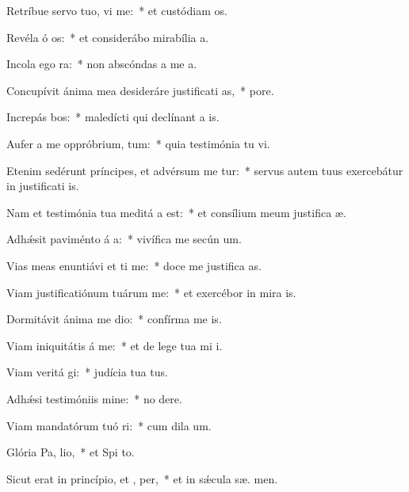 \item Retríbue servo tuo, vi me:~* et custódiam  os.
\item Revéla ó os:~* et considerábo mirabília   a.
\item Incola ego   ra:~* non abscóndas a me  a.
\item Concupívit ánima mea desideráre justificati as,~*   pore.
\item Increpás bos:~* maledícti qui declínant a  is.
\item Aufer a me oppróbrium,  tum:~* quia testimónia tu vi.
\item Etenim sedérunt príncipes, et advérsum me tur:~* servus autem tuus exercebátur in justificati is.
\item Nam et testimónia tua meditá a est:~* et consílium meum justifica æ.
\item Adhǽsit paviménto á a:~* vivífica me secún  um.
\item Vias meas enuntiávi et ti me:~* doce me justifica as.
\item Viam justificatiónum tuárum  me:~* et exercébor in mira is.
\item Dormitávit ánima me  dio:~* confírma me   is.
\item Viam iniquitátis á  me:~* et de lege tua mi i.
\item Viam veritá gi:~* judícia tua   tus.
\item Adhǽsi testimóniis  mine:~* no  dere.
\item Viam mandatórum tuó ri:~* cum dila  um.
\item Glória Pa,  lio,~* et Spi to.
\item Sicut erat in princípio, et ,  per,~* et in sǽcula sæ. men.
